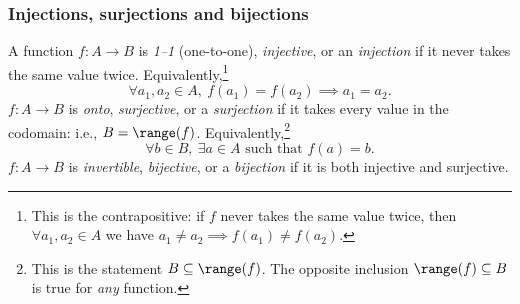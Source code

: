 \subsubsection*{Injections, surjections and bijections}

\begin{defn}\label{defn:11}
A function $f:A\to B$ is \emph{1--1} (one-to-one), \emph{injective}, or an \emph{injection} if it never takes the same value twice. Equivalently,\footnote{This is the contrapositive: if $f$ never takes the same value twice, then $\forall a_1, a_2\in A$ we have $a_1\neq a_2\implies f(a_1)\neq f(a_2)$.}
\[\forall a_1,a_2\in A,\ f(a_1)=f(a_2)\implies a_1=a_2.\]
$f:A\to B$ is \emph{onto}, \emph{surjective}, or a \emph{surjection} if it takes every value in the codomain: i.e., $B=\range(f)$. Equivalently,\footnote{This is the statement $B\subseteq\range(f)$. The opposite inclusion $\range(f)\subseteq B$ is true for \emph{any} function.}
\[\forall b\in B,\ \exists a\in A\text{ such that }f(a)=b.\]
$f:A\to B$ is \emph{invertible}, \emph{bijective}, or a \emph{bijection} if it is both injective and surjective.
\end{defn}

